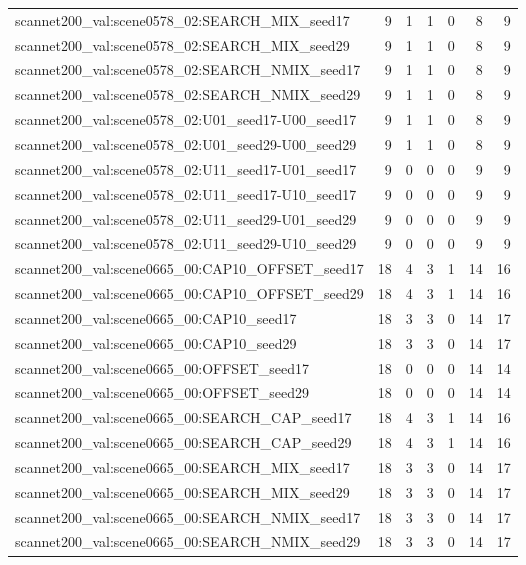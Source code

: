 \begin{table}[t]
\begin{tabular}{lrrrrrr}
scannet200\_val:scene0578\_02:SEARCH\_MIX\_seed17 & 9 & 1 & 1 & 0 & 8 & 9 \\
scannet200\_val:scene0578\_02:SEARCH\_MIX\_seed29 & 9 & 1 & 1 & 0 & 8 & 9 \\
scannet200\_val:scene0578\_02:SEARCH\_NMIX\_seed17 & 9 & 1 & 1 & 0 & 8 & 9 \\
scannet200\_val:scene0578\_02:SEARCH\_NMIX\_seed29 & 9 & 1 & 1 & 0 & 8 & 9 \\
scannet200\_val:scene0578\_02:U01\_seed17-U00\_seed17 & 9 & 1 & 1 & 0 & 8 & 9 \\
scannet200\_val:scene0578\_02:U01\_seed29-U00\_seed29 & 9 & 1 & 1 & 0 & 8 & 9 \\
scannet200\_val:scene0578\_02:U11\_seed17-U01\_seed17 & 9 & 0 & 0 & 0 & 9 & 9 \\
scannet200\_val:scene0578\_02:U11\_seed17-U10\_seed17 & 9 & 0 & 0 & 0 & 9 & 9 \\
scannet200\_val:scene0578\_02:U11\_seed29-U01\_seed29 & 9 & 0 & 0 & 0 & 9 & 9 \\
scannet200\_val:scene0578\_02:U11\_seed29-U10\_seed29 & 9 & 0 & 0 & 0 & 9 & 9 \\
scannet200\_val:scene0665\_00:CAP10\_OFFSET\_seed17 & 18 & 4 & 3 & 1 & 14 & 16 \\
scannet200\_val:scene0665\_00:CAP10\_OFFSET\_seed29 & 18 & 4 & 3 & 1 & 14 & 16 \\
scannet200\_val:scene0665\_00:CAP10\_seed17 & 18 & 3 & 3 & 0 & 14 & 17 \\
scannet200\_val:scene0665\_00:CAP10\_seed29 & 18 & 3 & 3 & 0 & 14 & 17 \\
scannet200\_val:scene0665\_00:OFFSET\_seed17 & 18 & 0 & 0 & 0 & 14 & 14 \\
scannet200\_val:scene0665\_00:OFFSET\_seed29 & 18 & 0 & 0 & 0 & 14 & 14 \\
scannet200\_val:scene0665\_00:SEARCH\_CAP\_seed17 & 18 & 4 & 3 & 1 & 14 & 16 \\
scannet200\_val:scene0665\_00:SEARCH\_CAP\_seed29 & 18 & 4 & 3 & 1 & 14 & 16 \\
scannet200\_val:scene0665\_00:SEARCH\_MIX\_seed17 & 18 & 3 & 3 & 0 & 14 & 17 \\
scannet200\_val:scene0665\_00:SEARCH\_MIX\_seed29 & 18 & 3 & 3 & 0 & 14 & 17 \\
scannet200\_val:scene0665\_00:SEARCH\_NMIX\_seed17 & 18 & 3 & 3 & 0 & 14 & 17 \\
scannet200\_val:scene0665\_00:SEARCH\_NMIX\_seed29 & 18 & 3 & 3 & 0 & 14 & 17 \\

\end{tabular}
\end{table}
